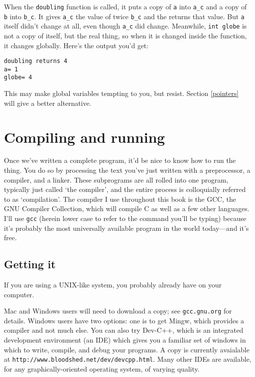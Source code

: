 \documentclass[12pt]{article}
\makeatletter
\def\ttind#1{\index{#1@{\tt #1}}{\tt #1}}
\makeatother
\begin{document}
When the {\tt doubling} function is called, it puts a copy of {\tt a} into {\tt a\_c} and a copy of {\tt b}
into {\tt b\_c}. It gives {\tt a\_c} the value of twice {\tt b\_c} and the returns that value. But {\tt a}
itself didn't change at all, even though {\tt a\_c} did change. Meanwhile, {\tt int globe} is not a copy of
itself, but the real thing, so when it is changed inside the function, it changes globally.
Here's the output you'd get:
\begin{verbatim}
doubling returns 4
a= 1
globe= 4
\end{verbatim}

This may make global variables tempting to you, but resist. Section \ref{pointers} will give a better
alternative.

\section{Compiling and running}

Once we've written a complete program, it'd be nice to know how to run the
thing. You do so by processing the text you've just written with a
preprocessor, a compiler, and a linker. These subprograms are all rolled
into one program, typically just called `the compiler', and the entire
process is colloquially referred to as `compilation'. The compiler I use
throughout this book is the GCC, the GNU Compiler Collection, which will
compile C as well as a few other languages. I'll use {\tt gcc} (herein
lower case to refer to the command you'll be typing) because it's probably
the most universally available program in the world today---and it's free.


\subsection{Getting it} If you are using a UNIX-like system, you probably already have \ttind{gcc} on your
computer.

Mac and Windows users will need to download a copy; see {\tt gcc.gnu.org}
for details. Windows users have two options: one is to get Mingw,
which provides a compiler and not much else. You can also try Dev-C++, which is an integrated development
environment (an IDE) which gives you a familiar set of windows in which to write, compile, and debug your
programs. A copy is currently avaialable at {\tt http://www.bloodshed.net/dev/devcpp.html}.
Many other IDEs are available, for any graphically-oriented operating system, of varying quality.
\end{document}
